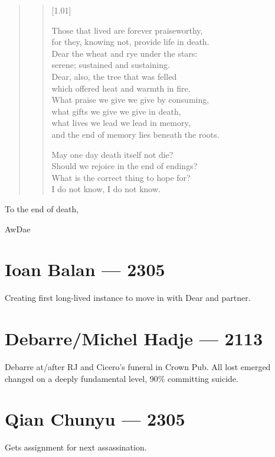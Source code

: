 \begin{quote}
\begin{verse}[1.01\textwidth]




    Those that lived are forever praiseworthy,\\
    for they, knowing not, provide life in death.\\
    Dear the wheat and rye under the stars:\\
    serene; sustained and sustaining.\\
    Dear, also, the tree that was felled\\
    which offered heat and warmth in fire.\\
    What praise we give we give by consuming,\\
    what gifts we give we give in death,\\
    what lives we lead we lead in memory,\\
    and the end of memory lies beneath the roots.


    May one day death itself not die?\\
    Should we rejoice in the end of endings?\\
    What is the correct thing to hope for?\\
    I do not know, I do not know.
  \end{verse}

\end{quote}
To the end of death,

AwDae

\chapter*{Ioan Balan — 2305}

Creating first long-lived instance to move in with Dear and partner.

\chapter*{Debarre/Michel Hadje — 2113}

Debarre at/after RJ and Cicero's funeral in Crown Pub. All lost emerged changed on a deeply fundamental level, 90\% committing suicide.

\chapter*{Qian Chunyu — 2305}

Gets assignment for next assassination.
